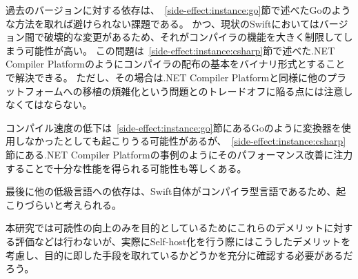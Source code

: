 過去のバージョンに対する依存は、~\ref{side-effect:instance:go}節で述べたGoのような方法を取れば避けられない課題である。
かつ、現状のSwiftにおいてはバージョン間で破壊的な変更があるため、それがコンパイラの機能を大きく制限してしまう可能性が高い。
この問題は~\ref{side-effect:instance:csharp}節で述べた.NET Compiler Platformのようにコンパイラの配布の基本をバイナリ形式とすることで解決できる。
ただし、その場合は.NET Compiler Platformと同様に他のプラットフォームへの移植の煩雑化という問題とのトレードオフに陥る点には注意しなくてはならない。

コンパイル速度の低下は~\ref{side-effect:instance:go}節にあるGoのように変換器を使用しなかったとしても起こりうる可能性があるが、~\ref{side-effect:instance:csharp}節にある.NET Compiler Platformの事例のようにそのパフォーマンス改善に注力することで十分な性能を得られる可能性も等しくある。

最後に他の低級言語への依存は、Swift自体がコンパイラ型言語であるため、起こりづらいと考えられる。

本研究では可読性の向上のみを目的としているためにこれらのデメリットに対する評価などは行わないが、実際にSelf-host化を行う際にはこうしたデメリットを考慮し、目的に即した手段を取れているかどうかを充分に確認する必要があるだろう。

